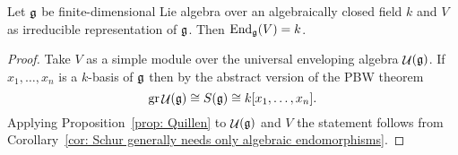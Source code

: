\begin{cor}
 Let $\mathfrak{g}$ be finite-dimensional Lie algebra over an algebraically closed field $k$ and $V$ as irreducible representation of $\mathfrak{g}$. Then $\operatorname{End}_{\mathfrak{g}}(V) = k$.
\end{cor}
\begin{proof}
 Take $V$ as a simple module over the universal enveloping algebra $\mathop{\mathcal{U}}(\mathfrak{g})$. If $x_1, \dotsc, x_n$ is a $k$-basis of $\mathfrak{g}$ then by the abstract version of the PBW theorem
 \[
  \operatorname{gr} \mathop{\mathcal{U}}(\mathfrak{g}) \cong S(\mathfrak{g}) \cong k[x_1, \dotsc, x_n].
 \]
 Applying Proposition~\ref{prop: Quillen} to $\mathop{\mathcal{U}}(\mathfrak{g})$ and $V$ the statement follows from Corollary~\ref{cor: Schur generally needs only algebraic endomorphisms}.
\end{proof}

































